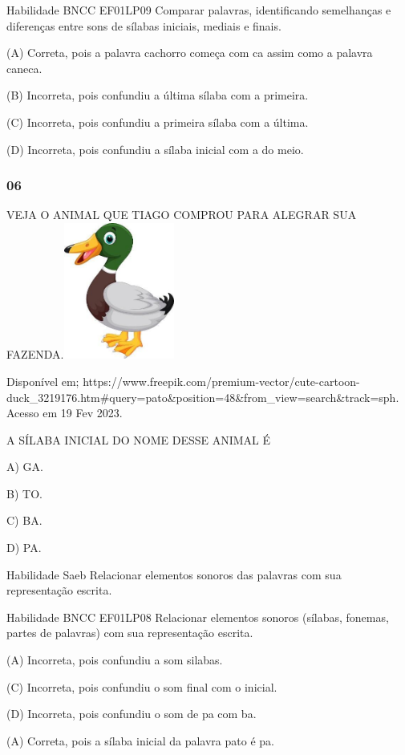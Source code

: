 \begin{escola}
Habilidade BNCC EF01LP09 Comparar palavras, identificando semelhanças e
diferenças entre sons de sílabas iniciais, mediais e finais.

(A) Correta, pois a palavra cachorro começa com ca assim como a palavra
caneca.

(B) Incorreta, pois confundiu a última sílaba com a primeira.

(C) Incorreta, pois confundiu a primeira sílaba com a última.

(D) Incorreta, pois confundiu a sílaba inicial com a do meio.

\subsubsection{06}\label{section-46}

VEJA O ANIMAL QUE TIAGO COMPROU PARA ALEGRAR SUA
FAZENDA.\includegraphics[width=1.43478in,height=1.76408in]{media/image215.jpg}

Disponível em;
https://www.freepik.com/premium-vector/cute-cartoon-duck\_3219176.htm\#query=pato\&position=48\&from\_view=search\&track=sph.
Acesso em 19 Fev 2023.

A SÍLABA INICIAL DO NOME DESSE ANIMAL É

A) GA.

B) TO.

C) BA.

D) PA.

Habilidade Saeb Relacionar elementos sonoros das palavras com sua
representação escrita.

Habilidade BNCC EF01LP08 Relacionar elementos sonoros (sílabas, fonemas,
partes de palavras) com sua representação escrita.

\protect\hypertarget{_heading=h.19c6y18}{}{}(A) Incorreta, pois
confundiu a som silabas.

(C) Incorreta, pois confundiu o som final com o inicial.

(D) Incorreta, pois confundiu o som de pa com ba.

(A) Correta, pois a sílaba inicial da palavra pato é pa.


\end{escola}
